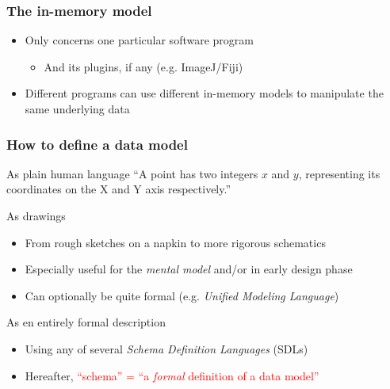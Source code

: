 \begin{frame}
  \frametitle{The in-memory model}

  \begin{itemize}
    \item Only concerns one particular software program
      \begin{itemize}
        \item And its plugins, if any (e.g. ImageJ/Fiji)
      \end{itemize}
    \item Different programs can use different in-memory models to manipulate
          the same underlying data
  \end{itemize}
\end{frame}

\begin{frame}
  \frametitle{How to define a data model}

  \begin{block}{As plain human language}
    ``A point has two integers $x$ and $y$, representing its coordinates on the
    X and Y axis respectively.''
  \end{block}

  \begin{block}{As drawings}
    \begin{itemize}
      \item From rough sketches on a napkin to more rigorous schematics
      \item Especially useful for the \emph{mental model} and/or in early design
            phase
      \item Can optionally be quite formal (e.g. \emph{Unified Modeling Language})
    \end{itemize}
  \end{block}

  \begin{block}{As en entirely formal description}
    \begin{itemize}
      \item Using any of several \emph{Schema Definition Languages} (SDLs)
      \item Hereafter, \textcolor<2>{red}{``schema'' = ``a \emph{formal} definition of a data model''}
    \end{itemize}
  \end{block}
\end{frame}

